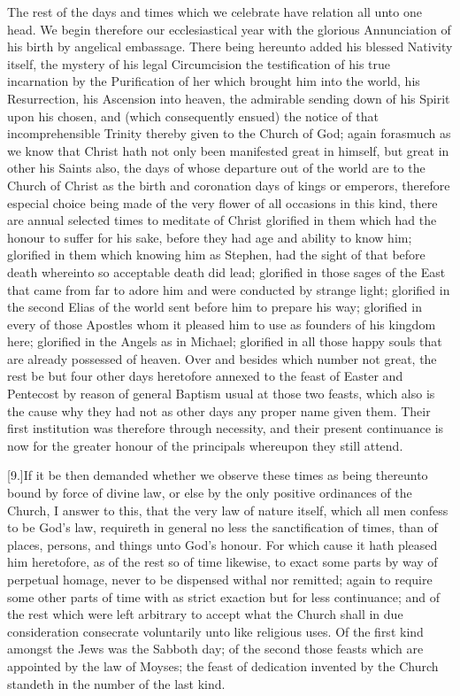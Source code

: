 The rest of the days and times which we celebrate have relation all unto one head. We begin therefore our ecclesiastical year with the glorious Annunciation of his birth by angelical embassage. There being hereunto added his blessed Nativity itself, the mystery of his legal Circumcision the testification of his true incarnation by the Purification of her which brought him into the world, his Resurrection, his Ascension into heaven, the admirable sending down of his Spirit upon his chosen, and (which consequently ensued) the notice of that incomprehensible Trinity thereby given to the Church of God; again forasmuch as we know that Christ hath not only been manifested great in himself, but great in other his Saints also, the days of whose departure out of the world are to the Church of Christ as the birth and coronation days of kings or emperors, therefore especial choice being made of the very flower of all occasions in this kind, there are annual selected times to meditate of Christ glorified in them which had the honour to suffer for his sake, before they had age and ability to know him; glorified in them which knowing him as Stephen, had the sight of that before death whereinto so acceptable death did lead; glorified in those sages of the East that came from far to adore him and were conducted by strange light; glorified in the second Elias of the world sent before him to prepare his way; glorified in every of those Apostles whom it pleased him to use as founders of his kingdom here; glorified in the Angels as in Michael; glorified in all those happy souls that are already possessed of heaven. Over and besides which number not great, the rest be but four other days heretofore annexed to the feast of Easter and Pentecost by reason of general Baptism usual at those two feasts, which also is the cause why they had not as other days any proper name given them. Their first institution was therefore through necessity, and their  present continuance is now for the greater honour of the principals whereupon they still attend.

[9.]If it be then demanded whether we observe these times as being thereunto bound by force of divine law, or else by the only positive ordinances of the Church, I answer to this, that the very law of nature itself, which all men confess to be God’s law, requireth in general no less the sanctification of times, than of places, persons, and things unto God’s honour. For which cause it hath pleased him heretofore, as of the rest so of time likewise, to exact some parts by way of perpetual homage, never to be dispensed withal nor remitted; again to require some other parts of time with as strict exaction but for less continuance; and of the rest which were left arbitrary to accept what the Church shall in due consideration consecrate voluntarily unto like religious uses. Of the first kind amongst the Jews was the Sabboth day; of the second those feasts which are appointed by the law of Moyses; the feast of dedication invented by the Church standeth in the number of the last kind.

